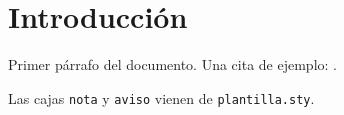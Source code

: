 \documentclass[a4paper,12pt]{article}
\begin{document}
\portada
\indice

\section{Introducción}

Primer párrafo del documento. Una cita de ejemplo: \cite{knuth1984}.

\begin{nota}
    Las cajas \texttt{nota} y \texttt{aviso} vienen de \texttt{plantilla.sty}.
\end{nota}

\printbibliography
\end{document}
